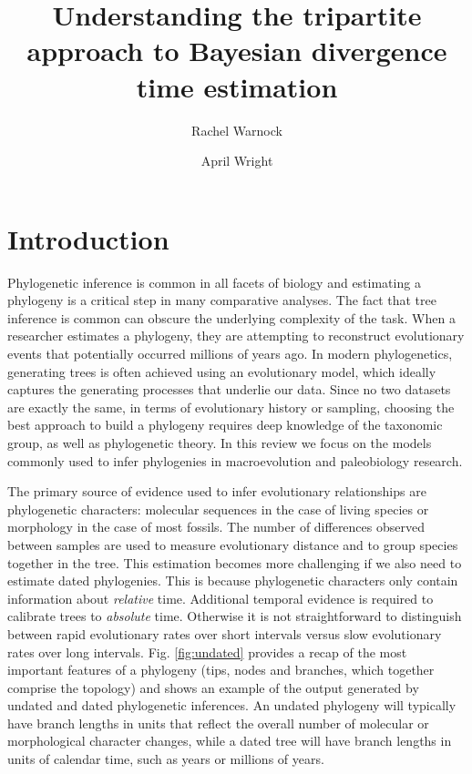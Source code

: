 \documentclass[11pt]{article}
\title{Understanding the tripartite approach to Bayesian divergence time estimation}
\author[1,2]{Rachel Warnock} \author[3]{April Wright}
\affil[1]{Department of Biosystems Science and Engineering, ETH Z\"urich, Basel, Switzerland}
\affil[2]{Swiss Institute of Bioinformatics (SIB), Switzerland}
\affil[3]{Department of Biological Sciences, Southeastern Louisiana University, Hammond, United States}
\date{}
\begin{document}
\maketitle

\section{Introduction}

Phylogenetic inference is common in all facets of biology and estimating a phylogeny is a critical step in many comparative analyses. The fact that tree inference is common can obscure the underlying complexity of the task.
When a researcher estimates a phylogeny, they are attempting to reconstruct evolutionary events that potentially occurred millions of years ago.
In modern phylogenetics, generating trees is often achieved using an evolutionary model, which ideally captures the generating processes that underlie our data.
Since no two datasets are exactly the same, in terms of evolutionary history or sampling, 
choosing the best approach to build a phylogeny requires deep knowledge of the taxonomic group, as well as phylogenetic theory.
In this review we focus on the models commonly used to infer phylogenies in macroevolution and paleobiology research.

The primary source of evidence used to infer evolutionary relationships are phylogenetic characters: molecular sequences in the case of living species or morphology in the case of most fossils. 
The number of differences observed between samples are used to measure evolutionary distance and to group species together in the tree.
This estimation becomes more challenging if we also need to estimate dated phylogenies.
This is because phylogenetic characters only contain information about \textit{relative} time. 
Additional temporal evidence is required to calibrate trees to \textit{absolute} time.
Otherwise it is not straightforward to distinguish between rapid evolutionary rates over short intervals versus slow evolutionary rates over long intervals.
Fig. \ref{fig:undated} provides a recap of the most important features of a phylogeny (tips, nodes and branches, which together comprise the topology) and shows an example of the output generated by undated and dated phylogenetic inferences. 
An undated phylogeny will typically have branch lengths in units that reflect the overall number of molecular or morphological character changes, while a dated tree will have branch lengths in units of calendar time, such as years or millions of years.
\end{document}
